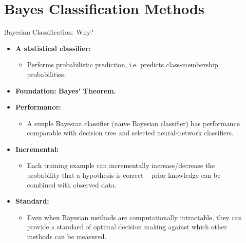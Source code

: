 \section{Bayes Classification Methods}

\begin{frame}{Bayesian Classification: Why?}
	\begin{itemize}
		\item \textbf{A statistical classifier:}
		      \begin{itemize}
			      \item Performs probabilistic prediction, i.e. predicts class-membership probabilities.
		      \end{itemize}
		\item \textbf{Foundation:} \textbf{\color{airforceblue}Bayes' Theorem.}
		\item \textbf{Performance:}
		      \begin{itemize}
			      \item A simple Bayesian classifier (naïve Bayesian classifier) has performance comparable with decision tree and selected neural-network classifiers.
		      \end{itemize}
		\item \textbf{Incremental:}
		      \begin{itemize}
			      \item Each training example can incrementally increase/decrease the probability that a hypothesis is correct -- prior knowledge can be combined with observed data.
		      \end{itemize}
		\item \textbf{Standard:}
		      \begin{itemize}
			      \item Even when Bayesian methods are computationally intractable, they can provide a standard of optimal decision making against which other methods can be measured.
		      \end{itemize}
	\end{itemize}
\end{frame}

